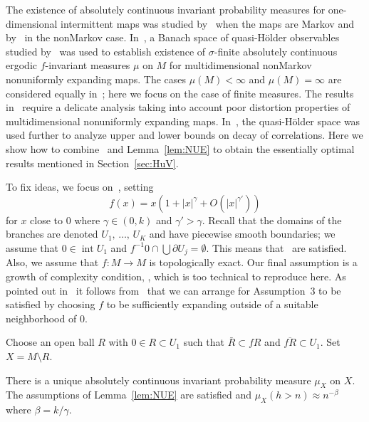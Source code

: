 \documentclass[AHL,Unicode,longabstracts,published]{cedram}
\DeclareMathOperator{\Int}{int}
\newcommand*{\MK}{\mkern 2mu}
\begin{document}
The existence of absolutely continuous invariant probability measures for one-dimensional intermittent maps was studied by~\cite{Thaler80} when the maps are Markov and by~\cite{Zweimuller98} in the nonMarkov case. In~\cite{HuVaienti09}, a Banach space of quasi-H\"older observables studied by~\cite{Keller85,Saussol00} was used to establish existence of $\sigma$-finite absolutely continuous ergodic $f$-invariant measures $\mu$ on $M$ for multidimensional nonMarkov nonuniformly expanding maps. The cases $\mu(M)<\infty$ and $\mu(M)=\infty$ are considered equally in~\cite{HuVaienti09}; here we focus on the case of finite measures. The results in~\cite{HuVaienti09} require a delicate analysis taking into account poor distortion properties of multidimensional nonuniformly expanding maps. In~\cite{HuVaientiapp}, the quasi-H\"older space was used further to analyze upper and lower bounds on decay of correlations. Here we show how to combine~\cite{HuVaienti09} and Lemma~\ref{lem:NUE} to obtain the essentially optimal results mentioned in Section~\ref{sec:HuV}.


To fix ideas, we focus on~\cite[Example~5.1]{HuVaientiapp}, setting
\[
f(x)=x\left(1+|x|^\gamma+O\left(|x|^{\gamma'}\right)\right)
\]
for $x$ close to $0$ where $\gamma\in(0,k)$ and $\gamma'>\gamma$. Recall that the domains of the branches are denoted $U_1,\,\dots,\,U_K$ and have piecewise smooth boundaries; we assume that $0\in\Int U_1$ and $f^{-1}0\cap \bigcup\partial U_j=\emptyset$. This means that~\cite[Theorem~A$\MK$(Assumptions~1 and~2)]{HuVaienti09} are satisfied. Also, we assume that $f:M\to M$ is topologically exact. Our final assumption is a growth of complexity condition, \cite[Theorem~A$\MK$(Assumption~3)]{HuVaienti09}, which is too technical to reproduce here. As pointed out in~\cite[Remark~5.2]{HuVaientiapp} it follows from~\cite[Lemma~2.1]{Saussol00} that we can arrange for Assumption~3 to be satisfied by choosing $f$ to be sufficiently expanding outside of a suitable neighborhood of $0$.

Choose an open ball $R$ with $0\in R\subset U_1$ such that $\bar R\subset fR$ and $\overline{fR}\subset U_1$. Set $X=M\setminus R$.

\begin{prop}\label{prop:HuV}
There is a unique absolutely continuous invariant probability measure $\mu_X$ on $X$. The assumptions of Lemma~\ref{lem:NUE} are satisfied and $\mu_X(h>n)\approx n^{-\beta}$ where $\beta=k/\gamma$.
\end{prop}
\end{document}
